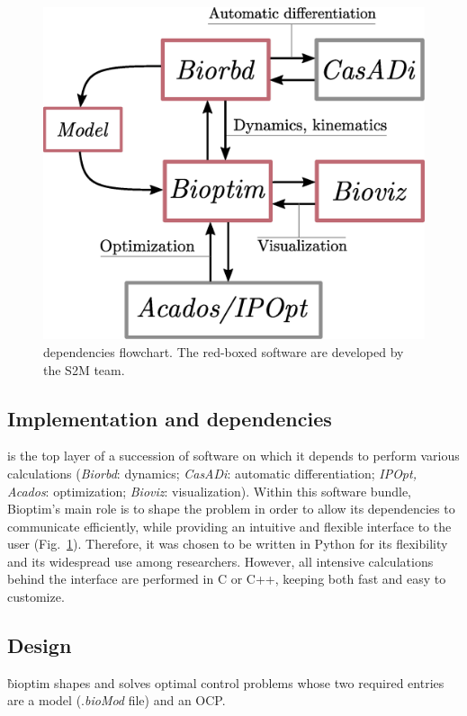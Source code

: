 \begin{figure}[t!]
\centering
\includegraphics[width=0.9\columnwidth]{figures/dependencies.eps}
\caption{\bioptim dependencies flowchart. The red-boxed software are developed by the S2M team.}
\label{fig:dependencies}
\vspace*{-0.5cm}
\end{figure}


\subsection{Implementation and dependencies}
\bioptim is the top layer of a succession of software on which it depends to perform various calculations (\textit{Biorbd}: dynamics; \textit{CasADi}: automatic differentiation; \textit{IPOpt, Acados}: optimization; \textit{Bioviz}: visualization).
Within this software bundle, Bioptim's main role is to shape the problem in order to allow its dependencies to communicate efficiently, while providing an intuitive and flexible interface to the user (Fig.~\ref{fig:dependencies}).
Therefore, it was chosen to be written in Python for its flexibility and its widespread use among researchers.
However, all intensive calculations behind the interface are performed in C or C++, keeping \bioptim both fast and easy to customize.

\subsection{Design}
\`bioptim shapes and solves optimal control problems whose two required entries are a model (.\textit{bioMod} file) and an OCP.
 
